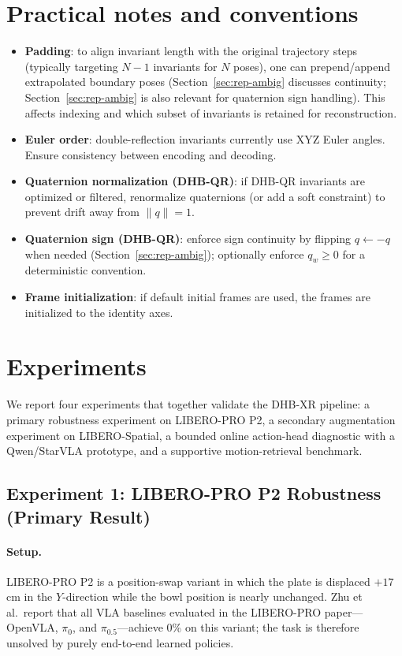\documentclass[11pt]{article}
\begin{document}
\section{Practical notes and conventions}
\begin{itemize}
  \item \textbf{Padding}: to align invariant length with the original trajectory steps (typically targeting $N-1$ invariants for $N$ poses), one can prepend/append extrapolated boundary poses (Section~\ref{sec:rep-ambig} discusses continuity; Section~\ref{sec:rep-ambig} is also relevant for quaternion sign handling). This affects indexing and which subset of invariants is retained for reconstruction.
  \item \textbf{Euler order}: double-reflection invariants currently use XYZ Euler angles. Ensure consistency between encoding and decoding.
  \item \textbf{Quaternion normalization (DHB-QR)}: if DHB-QR invariants are optimized or filtered, renormalize quaternions (or add a soft constraint) to prevent drift away from $\lVert q\rVert=1$.
  \item \textbf{Quaternion sign (DHB-QR)}: enforce sign continuity by flipping $q\leftarrow -q$ when needed (Section~\ref{sec:rep-ambig}); optionally enforce $q_w\ge 0$ for a deterministic convention.
  \item \textbf{Frame initialization}: if default initial frames are used, the frames are initialized to the identity axes.
\end{itemize}

\section{Experiments}\label{sec:experiments}
We report four experiments that together validate the DHB-XR pipeline: a primary robustness experiment on LIBERO-PRO P2, a secondary augmentation experiment on LIBERO-Spatial, a bounded online action-head diagnostic with a Qwen/StarVLA prototype, and a supportive motion-retrieval benchmark.

\subsection{Experiment 1: LIBERO-PRO P2 Robustness (Primary Result)}\label{sec:exp-liberopro}
\paragraph{Setup.}
LIBERO-PRO P2 \cite{zhu2025liberopro} is a position-swap variant in which the plate is displaced $+17$\,cm in the $Y$-direction while the bowl position is nearly unchanged. Zhu et al.\ report that all VLA baselines evaluated in the LIBERO-PRO paper---OpenVLA, $\pi_0$, and $\pi_{0.5}$---achieve 0\% on this variant; the task is therefore unsolved by purely end-to-end learned policies.
\end{document}
